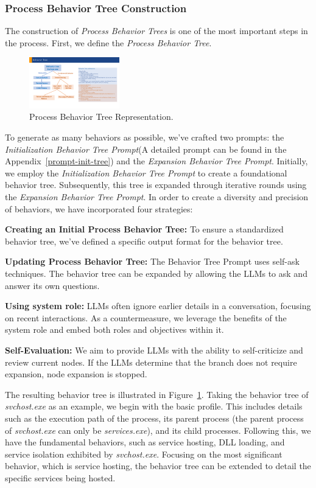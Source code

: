 \subsubsection{Process Behavior Tree Construction}
The construction of \textit{Process Behavior Trees} is one of the most important steps in the process.
First, we define the \textit{Process Behavior Tree}.

\begin{figure}[h]
    \centering
      \includegraphics[width=0.35\textwidth]{figs/tree1.pdf}
    \caption{Process Behavior Tree Representation.}
    \label{fig:BT}
\end{figure}

To generate as many behaviors as possible, we've crafted two prompts: the \textit{Initialization Behavior Tree Prompt}(A detailed prompt can be found in the Appendix~\ref{prompt-init-tree}) and the \textit{Expansion Behavior Tree Prompt}. Initially, we employ the \textit{Initialization Behavior Tree Prompt} to create a foundational behavior tree. Subsequently, this tree is expanded through iterative rounds using the \textit{Expansion Behavior Tree Prompt}. In order to create a diversity and precision of behaviors, we have incorporated four strategies:

\noindent
{\bf Creating an Initial Process Behavior Tree:} To ensure a standardized behavior tree, we've defined a specific output format for the behavior tree.

\noindent
{\bf Updating Process Behavior Tree:}
The Behavior Tree Prompt uses self-ask techniques. The behavior tree can be expanded by allowing the LLMs to ask and answer its own questions.

\noindent
{\bf Using system role:} 
LLMs often ignore earlier details in a conversation, focusing on recent interactions. As a countermeasure, we leverage the benefits of the system role and embed both roles and objectives within it.

\noindent
{\bf Self-Evaluation:}
We aim to provide LLMs with the ability to self-criticize and review current nodes. If the LLMs determine that the branch does not require expansion, node expansion is stopped.

The resulting behavior tree is illustrated in Figure~\ref{fig:BT}. Taking the behavior tree of \textit{svchost.exe} as an example, we begin with the basic profile. This includes details such as the execution path of the process, its parent process (the parent process of \textit{svchost.exe} can only be \textit{services.exe}), and its child processes. Following this, we have the fundamental behaviors, such as service hosting, DLL loading, and service isolation exhibited by \textit{svchost.exe}. Focusing on the most significant behavior, which is service hosting, the behavior tree can be extended to detail the specific services being hosted. 

